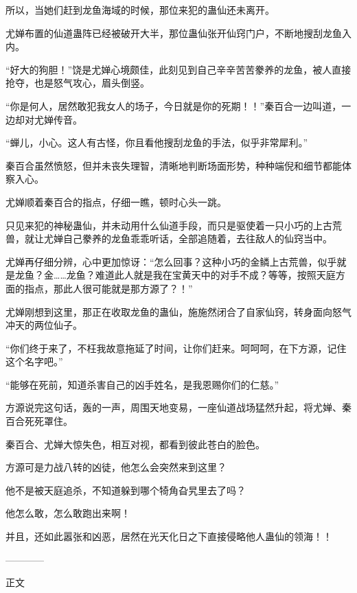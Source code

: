 \begin{this_body}
所以，当她们赶到龙鱼海域的时候，那位来犯的蛊仙还未离开。

尤婵布置的仙道蛊阵已经被破开大半，那位蛊仙张开仙窍门户，不断地搜刮龙鱼入内。

“好大的狗胆！”饶是尤婵心境颇佳，此刻见到自己辛辛苦苦豢养的龙鱼，被人直接抢夺，也是怒气攻心，眉头倒竖。

“你是何人，居然敢犯我女人的场子，今日就是你的死期！！”秦百合一边叫道，一边却对尤婵传音。

“蝉儿，小心。这人有古怪，你且看他搜刮龙鱼的手法，似乎非常犀利。”

秦百合虽然愤怒，但并未丧失理智，清晰地判断场面形势，种种端倪和细节都能体察入心。

尤婵顺着秦百合的指点，仔细一瞧，顿时心头一跳。

只见来犯的神秘蛊仙，并未动用什么仙道手段，而只是驱使着一只小巧的上古荒兽，就让尤婵自己豢养的龙鱼乖乖听话，全部追随着，去往敌人的仙窍当中。

尤婵再仔细分辨，心中更加惊讶：“怎么回事？这种小巧的金鳞上古荒兽，似乎就是龙鱼？金……龙鱼？难道此人就是我在宝黄天中的对手不成？等等，按照天庭方面的指点，那此人很可能就是那方源了？！”

尤婵刚想到这里，那正在收取龙鱼的蛊仙，施施然闭合了自家仙窍，转身面向怒气冲天的两位仙子。

“你们终于来了，不枉我故意拖延了时间，让你们赶来。呵呵呵，在下方源，记住这个名字吧。”

“能够在死前，知道杀害自己的凶手姓名，是我恩赐你们的仁慈。”

方源说完这句话，轰的一声，周围天地变易，一座仙道战场猛然升起，将尤婵、秦百合死死罩住。

秦百合、尤婵大惊失色，相互对视，都看到彼此苍白的脸色。

方源可是力战八转的凶徒，他怎么会突然来到这里？

他不是被天庭追杀，不知道躲到哪个犄角旮旯里去了吗？

他怎么敢，怎么敢跑出来啊！

并且，还如此嚣张和凶恶，居然在光天化日之下直接侵略他人蛊仙的领海！！

------------

正文

\end{this_body}

